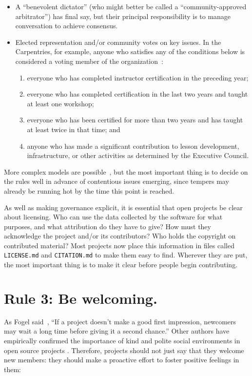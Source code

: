 \documentclass[10pt,letterpaper]{article}
\newcommand{\rulemajor}[1]{\section*{#1}}
\begin{document}
\begin{itemize}
	
\item
  A ``benevolent dictator'' (who might better be called a ``community-approved arbitrator'') has final say,
  but their principal responsibility is to manage conversation to achieve consensus.
	
\item
  Elected representation and/or community votes on key issues.
  In the Carpentries,
  for example,
  anyone who satisfies any of the conditions below is considered a voting member of the organization~\cite{carpentries-bylaws}:
  \begin{enumerate}
  \item
    everyone who has completed instructor certification in the preceding year;
  \item
    everyone who has completed certification in the last two years and taught at least one workshop;
  \item
    everyone who has been certified for more than two years and has taught at least twice in that time; and
  \item
    anyone who has made a significant contribution to lesson development, infrastructure, or other activities
    as determined by the Executive Council.
  \end{enumerate}

\end{itemize}

More complex models are possible~\cite{apache-governance},
but the most important thing is to decide on the rules well in advance of contentious issues emerging,
since tempers may already be running hot by the time this point is reached.

As well as making governance explicit,
it is essential that open projects be clear about licensing.
Who can use the data collected by the software for what purposes,
and what attribution do they have to give?
How must they acknowledge the project and/or its contributors?
Who holds the copyright on contributed material?
Most projects now place this information in files called \texttt{LICENSE.md} and \texttt{CITATION.md}
to make them easy to find.
Wherever they are put,
the most important thing is to make it clear before people begin contributing.

\rulemajor{Rule 3: Be welcoming.}

As Fogel said~\cite{fogel2005},
``If a project doesn't make a good first impression, newcomers may wait a long time before giving it a second chance.''
Other authors have empirically confirmed the importance of kind and polite social environments
in open source projects \cite{singh2012,steinmacher2013,steinmacher2018}.
Therefore,
projects should not just say that they welcome new members:
they should make a proactive effort to foster positive feelings in them:
\end{document}
